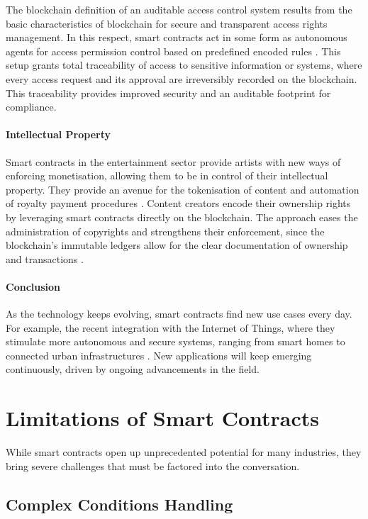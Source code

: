 The blockchain definition of an auditable access control system results from the basic characteristics of blockchain for secure and transparent access rights management. In this respect, smart contracts act in some form as autonomous agents for access permission control based on predefined encoded rules \cite{DamianoEtAl2019}. This setup grants total traceability of access to sensitive information or systems, where every access request and its approval are irreversibly recorded on the blockchain. This traceability provides improved security and an auditable footprint for compliance. 

\paragraph{Intellectual Property}

Smart contracts in the entertainment sector provide artists with new ways of enforcing monetisation, allowing them to be in control of their intellectual property. They provide an avenue for the tokenisation of content and automation of royalty payment procedures \cite{Hauck2021}. Content creators encode their ownership rights by leveraging smart contracts directly on the blockchain. The approach eases the administration of copyrights and strengthens their enforcement, since the blockchain's immutable ledgers allow for the clear documentation of ownership and transactions \cite{Hauck2021}.

\paragraph{Conclusion}

As the technology keeps evolving, smart contracts find new use cases every day. For example, the recent integration with the Internet of Things, where they stimulate more autonomous and secure systems, ranging from smart homes to connected urban infrastructures \cite{SchmittEtAl2019}. New applications will keep emerging continuously, driven by ongoing advancements in the field.

\section{Limitations of Smart Contracts}

While smart contracts open up unprecedented potential for many industries, they bring severe challenges that must be factored into the conversation.

\subsection{Complex Conditions Handling}

